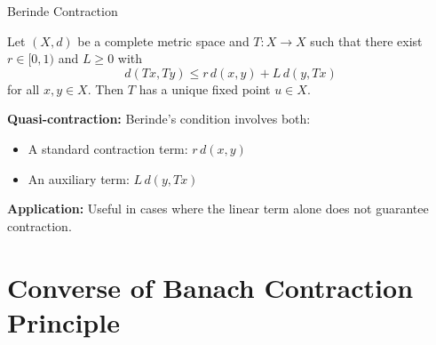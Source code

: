 \documentclass[aspectratio=169,10pt]{beamer}
\begin{document}
\begin{frame}{Berinde Contraction}
  \begin{theorem}[Berinde, 2004]
    Let $(X, d)$ be a complete metric space and $T : X \to X$ such that there exist
    $r \in [0,1)$ and $L \geq 0$ with
    \[
      d(Tx, Ty) \leq r \, d(x,y) + L \, d(y, Tx)
    \]
    for all $x, y \in X$. Then $T$ has a unique fixed point $u \in X$.
  \end{theorem}

  \vspace{0.3cm}

  \textbf{Quasi-contraction:} Berinde's condition involves both:
  \begin{itemize}
    \item A standard contraction term: $r \, d(x,y)$
    \item An auxiliary term: $L \, d(y, Tx)$
  \end{itemize}

  \vspace{0.3cm}

  \textbf{Application:} Useful in cases where the linear term alone does not guarantee contraction.
\end{frame}

\section{Converse of Banach Contraction Principle}
\end{document}
